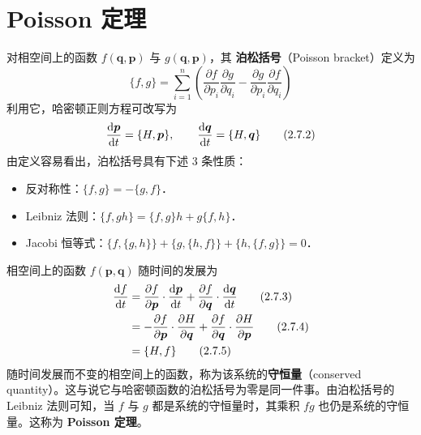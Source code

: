 
\section{Poisson 定理}

对相空间上的函数 $f(\bm{q},\bm{p})$ 与 $g(\bm{q},\bm{p})$，其 \textbf{泊松括号}（Poisson bracket）定义为
\begin{equation}
  \{f,g\} = \sum_{i=1}^{n}\left(\frac{\partial f}{\partial p_i}\frac{\partial g}{\partial q_i}-\frac{\partial g}{\partial p_i}\frac{\partial f}{\partial q_i}\right)
  \tag{2.7.1}
\end{equation}
利用它，哈密顿正则方程可改写为
\begin{equation}
  \frac{\mathrm{d}\bm{p}}{\mathrm{d} t} = \{H,\bm{p}\},\qquad
  \frac{\mathrm{d}\bm{q}}{\mathrm{d} t} = \{H,\bm{q}\}
  \tag{2.7.2}
\end{equation}
由定义容易看出，泊松括号具有下述 3 条性质：
\begin{itemize}[leftmargin=2em]
  \item 反对称性：$\{f,g\} = -\{g,f\}$．
  \item Leibniz 法则：$\{f,gh\} = \{f,g\}h+g\{f,h\}$．
  \item Jacobi 恒等式：$\{f,\{g,h\}\}+\{g,\{h,f\}\}+\{h,\{f,g\}\} = 0$．
\end{itemize}
相空间上的函数 $f(\bm{p},\bm{q})$ 随时间的发展为
\begin{align}
  \frac{\mathrm{d} f}{\mathrm{d} t} &= \frac{\partial f}{\partial\bm{p}}\cdot\frac{\mathrm{d}\bm{p}}{\mathrm{d} t}
    +\frac{\partial f}{\partial\bm{q}}\cdot\frac{\mathrm{d}\bm{q}}{\mathrm{d} t}
  \tag{2.7.3}\\
  &= -\frac{\partial f}{\partial\bm{p}}\cdot\frac{\partial H}{\partial\bm{q}}
    +\frac{\partial f}{\partial\bm{q}}\cdot\frac{\partial H}{\partial\bm{p}}
  \tag{2.7.4}\\
  &= \{H,f\}
  \tag{2.7.5}
\end{align}
随时间发展而不变的相空间上的函数，称为该系统的\textbf{守恒量}（conserved quantity）。这与说它与哈密顿函数的泊松括号为零是同一件事。由泊松括号的 Leibniz 法则可知，当 $f$ 与 $g$ 都是系统的守恒量时，其乘积 $fg$ 也仍是系统的守恒量。这称为 \textbf{Poisson 定理}。


